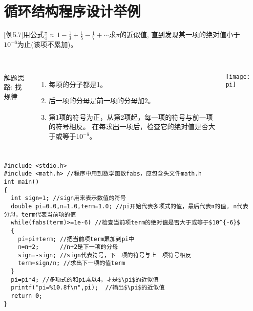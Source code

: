 
\section{循环结构程序设计举例}

\begin{frame}
$[$例5.7$]$用公式$\frac{\pi}{4}\approx 1-\frac{1}{3}+\frac{1}{5}-\frac{1}{7}+\cdots$求$\pi$的近似值, 直到发现某一项的绝对值小于$10^{-6}$为止(该项不累加)。\\
~\\
\begin{columns}
解题思路:  找规律
\begin{enumerate}
	\item 每项的分子都是1。
	\item 后一项的分母是前一项的分母加2。
	\item 第1项的符号为正，从第2项起，每一项的符号与前一项的符号相反。
	在每求出一项后，检查它的绝对值是否大于或等于$10^{-6}$。
\end{enumerate}
\texttt{[image: pi]}
\end{columns}
\end{frame}

\begin{frame}
\begin{lstlisting}
#include <stdio.h>
#include <math.h> //程序中用到数学函数fabs，应包含头文件math.h
int main()
{
  int sign=1; //sign用来表示数值的符号
  double pi=0.0,n=1.0,term=1.0; //pi开始代表多项式的值，最后代表π的值, n代表分母，term代表当前项的值
  while(fabs(term)>=1e-6) //检查当前项term的绝对值是否大于或等于$10^{-6}$
  {
    pi=pi+term; //把当前项term累加到pi中
    n=n+2;      //n+2是下一项的分母 
    sign=-sign; //sign代表符号，下一项的符号与上一项符号相反
    term=sign/n; //求出下一项的值term
  }
  pi=pi*4; //多项式的和pi乘以4，才是$\pi$的近似值
  printf("pi=%10.8f\n",pi);  //输出$\pi$的近似值  
  return 0;
}
\end{lstlisting}
\end{frame}


